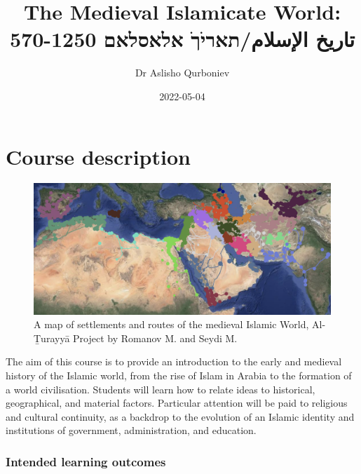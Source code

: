 \documentclass[
]{book}
\title{The Medieval Islamicate World: 570-1250 تاريخ الإسلام/תאריֹךֹ אלאסלאם}
\author{Dr Aslisho Qurboniev}
\date{2022-05-04}
\begin{document}
\maketitle

{
\setcounter{tocdepth}{1}
\tableofcontents
}
\hypertarget{course-description}{%
\chapter*{Course description}\label{course-description}}

\begin{figure}
\centering
\includegraphics{./files/map.png}
\caption{A map of settlements and routes of the medieval Islamic World, Al-Ṯurayyā Project by Romanov M. and Seydi M.}
\end{figure}

The aim of this course is to provide an introduction to the early and medieval history of the Islamic world, from the rise of Islam in Arabia to the formation of a world civilisation. Students will learn how to relate ideas to historical, geographical, and material factors. Particular attention will be paid to religious and cultural continuity, as a backdrop to the evolution of an Islamic identity and institutions of government, administration, and education.

\hypertarget{intended-learning-outcomes}{%
\subsection*{Intended learning outcomes}\label{intended-learning-outcomes}}
\end{document}
